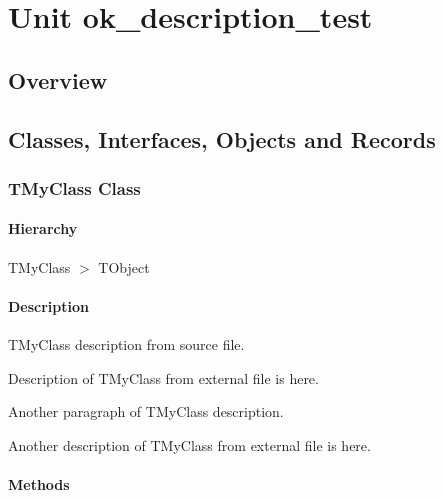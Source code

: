 \documentclass{report}
\newif\ifpdf
\begin{document}
\label{toc}\tableofcontents
\newpage
\newlength{\tmplength}
\chapter{Unit ok{\_}description{\_}test}
\label{ok_description_test}
\section{Overview}
\begin{description}
\item[\texttt{\begin{ttfamily}TMyClass\end{ttfamily} Class}]
\end{description}
\section{Classes, Interfaces, Objects and Records}
\ifpdf
\subsection*{\large{\textbf{TMyClass Class}}\normalsize\hspace{1ex}\hrulefill}
\else
\subsection*{TMyClass Class}
\fi
\label{ok_description_test.TMyClass}
\subsubsection*{\large{\textbf{Hierarchy}}\normalsize\hspace{1ex}\hfill}
TMyClass {$>$} TObject
\subsubsection*{\large{\textbf{Description}}\normalsize\hspace{1ex}\hfill}
TMyClass description from source file.

Description of TMyClass from external file is here.

Another paragraph of TMyClass description.

Another description of TMyClass from external file is here.\subsubsection*{\large{\textbf{Methods}}\normalsize\hspace{1ex}\hfill}
\end{document}
